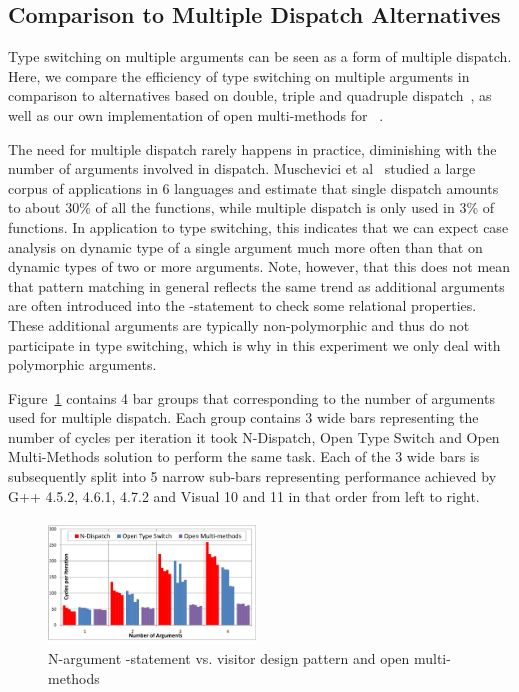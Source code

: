 \subsection{Comparison to Multiple Dispatch Alternatives}
\label{sec:dd}

Type switching on multiple arguments can be seen as a form of multiple dispatch. 
Here, we compare the efficiency of type switching on multiple arguments 
in comparison to alternatives based on double, triple and quadruple dispatch~\cite{Ingalls86}, 
as well as our own implementation of open multi-methods for \Cpp{}~\cite{OpenMM}.

The need for multiple dispatch rarely happens in practice, diminishing with the 
number of arguments involved in dispatch. Muschevici et al~\cite{MPTN08} studied 
a large corpus of applications in 6 languages and estimate that single dispatch 
amounts to about 30\% of all the functions, while multiple dispatch is only used 
in 3\% of functions. In application to type switching, this indicates that we 
can expect case analysis on dynamic type of a single argument much more often 
than that on dynamic types of two or more arguments. Note, however, that this 
does not mean that pattern matching in general reflects the same trend as 
additional arguments are often introduced into the -statement to 
check some relational properties. These additional arguments are typically 
non-polymorphic and thus do not participate in type switching, which is why in 
this experiment we only deal with polymorphic arguments.


Figure~\ref{fig:dispatch} contains 4 bar groups that corresponding to the number 
of arguments used for multiple dispatch. Each group contains 3 wide bars 
representing the number of cycles per iteration it took N-Dispatch, Open Type 
Switch and Open Multi-Methods solution to perform the same task. Each of the 3 
wide bars is subsequently split into 5 narrow sub-bars representing performance 
achieved by G++ 4.5.2, 4.6.1, 4.7.2 and Visual \Cpp{} 10 and 11 in that order from 
left to right.

\begin{figure}[htbp]
  \centering
    \includegraphics[width=0.49\textwidth]{Timing-N-arg.pdf}
  \caption{N-argument -statement vs. visitor design pattern and open multi-methods}
  \label{fig:dispatch}
\end{figure}

